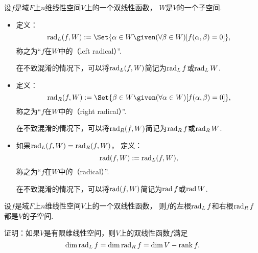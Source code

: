 \begin{definition}
设\(f\)是域\(F\)上\(n\)维线性空间\(V\)上的一个双线性函数，
\(W\)是\(V\)的一个子空间.
\begin{itemize}
	\item 定义：\begin{equation}
		\Rad_L(f,W)
		\defeq
		\Set{
			\alpha \in W
			\given
			(\forall\beta \in W)
			[f(\alpha,\beta) = 0]
		},
	\end{equation}
	称之为“\(f\)在\(W\)中的（left radical）”.

	在不致混淆的情况下，可以将\(\operatorname{rad}_L(f,W)\)简记为\(\operatorname{rad}_L f\)或\(\operatorname{rad}_L W\).

	\item 定义：\begin{equation}
		\Rad_R(f,W)
		\defeq
		\Set{
			\beta \in W
			\given
			(\forall\alpha \in W)
			[f(\alpha,\beta) = 0]
		},
	\end{equation}
	称之为“\(f\)在\(W\)中的（right radical）”.

	在不致混淆的情况下，可以将\(\operatorname{rad}_R(f,W)\)简记为\(\operatorname{rad}_R f\)或\(\operatorname{rad}_R W\).

	\item 如果\(\operatorname{rad}_L(f,W) = \operatorname{rad}_R(f,W)\)，
	定义：\begin{equation*}
		\operatorname{rad}(f,W)
		:=
		\operatorname{rad}_L(f,W),
	\end{equation*}
	称之为“\(f\)在\(W\)中的（radical）”.

	在不致混淆的情况下，可以将\(\operatorname{rad}(f,W)\)简记为\(\operatorname{rad} f\)或\(\operatorname{rad} W\).
\end{itemize}
\end{definition}

\begin{proposition}
设\(f\)是域\(F\)上\(n\)维线性空间\(V\)上的一个双线性函数，
则\(f\)的左根\(\operatorname{rad}_L f\)和右根\(\operatorname{rad}_R f\)都是\(V\)的子空间.
\end{proposition}

\begin{example}
证明：如果\(V\)是有限维线性空间，则\(V\)上的双线性函数\(f\)满足\begin{equation*}
	\dim\operatorname{rad}_L f
	= \dim\operatorname{rad}_R f
	= \dim V - \rank f.
\end{equation*}
\end{example}


